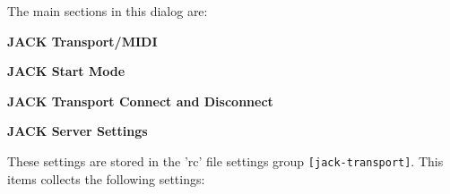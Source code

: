    The main sections in this dialog are:

   \begin{enumber}
      \item \textbf{JACK Transport/MIDI}
      \item \textbf{JACK Start Mode}
      \item \textbf{JACK Transport Connect and Disconnect}
      \item \textbf{JACK Server Settings}
   \end{enumber}

   \setcounter{ItemCounter}{0}      %

   These settings are stored in the 'rc' file settings group
   \texttt{[jack-transport]}.
   This items collects the following settings:

